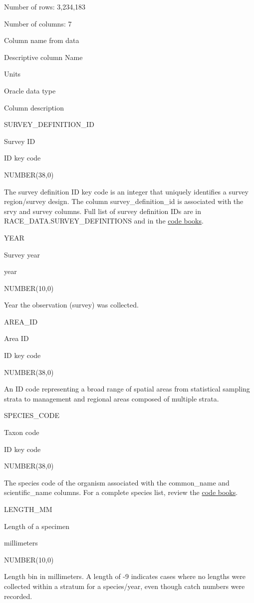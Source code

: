 \documentclass[
  letterpaper,
  oneside,
  open=any]{scrbook}
\begin{document}
Number of rows: 3,234,183

Number of columns: 7

Column name from data

Descriptive column Name

Units

Oracle data type

Column description

SURVEY\_DEFINITION\_ID

Survey ID

ID key code

NUMBER(38,0)

The survey definition ID key code is an integer that uniquely identifies
a survey region/survey design. The column survey\_definition\_id is
associated with the srvy and survey columns. Full list of survey
definition IDs are in RACE\_DATA.SURVEY\_DEFINITIONS and in the
\href{https://www.fisheries.noaa.gov/resource/document/groundfish-survey-species-code-manual-and-data-codes-manual}{code
books}.

YEAR

Survey year

year

NUMBER(10,0)

Year the observation (survey) was collected.

AREA\_ID

Area ID

ID key code

NUMBER(38,0)

An ID code representing a broad range of spatial areas from statistical
sampling strata to management and regional areas composed of multiple
strata.

SPECIES\_CODE

Taxon code

ID key code

NUMBER(38,0)

The species code of the organism associated with the common\_name and
scientific\_name columns. For a complete species list, review the
\href{https://www.fisheries.noaa.gov/resource/document/groundfish-survey-species-code-manual-and-data-codes-manual}{code
books}.

LENGTH\_MM

Length of a specimen

millimeters

NUMBER(10,0)

Length bin in millimeters. A length of -9 indicates cases where no
lengths were collected within a stratum for a species/year, even though
catch numbers were recorded.
\end{document}

